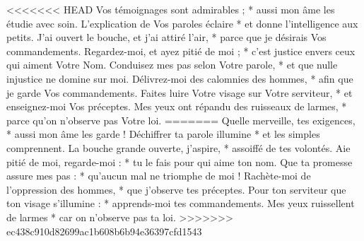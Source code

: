 <<<<<<< HEAD
Vos témoignages sont admirables ; * aussi mon âme les étudie avec soin.
\versseparator
L'explication de Vos paroles éclaire * et donne l'intelligence aux petits.
\versseparator
J'ai ouvert le bouche, et j'ai attiré l'air, * parce que je désirais Vos commandements.
\versseparator
Regardez-moi, et ayez pitié de moi ; * c'est justice envers ceux qui aiment Votre Nom.
\versseparator
Conduisez mes pas selon Votre parole, * et que nulle injustice ne domine sur moi.
\versseparator
Délivrez-moi des calomnies des hommes, * afin que je garde Vos commandements.
\versseparator
Faites luire Votre visage sur Votre serviteur, * et enseignez-moi Vos préceptes.
\versseparator
Mes yeux ont répandu des ruisseaux de larmes, * parce qu'on n'observe pas Votre loi.
=======
Quelle merveille, tes exigences, *
aussi mon âme les garde !
\versseparator
Déchiffrer ta parole illumine *
et les simples comprennent.
\versseparator
La bouche grande ouverte, j’aspire, *
assoiffé de tes volontés.
\versseparator
Aie pitié de moi, regarde-moi : *
tu le fais pour qui aime ton nom.
\versseparator
Que ta promesse assure mes pas : *
qu’aucun mal ne triomphe de moi !
\versseparator
Rachète-moi de l’oppression des hommes, *
que j’observe tes préceptes.
\versseparator
Pour ton serviteur que ton visage s’illumine : *
apprends-moi tes commandements.
\versseparator
Mes yeux ruissellent de larmes *
car on n’observe pas ta loi.
>>>>>>> ec438c910d82699ac1b608b6b94e36397cfd1543
